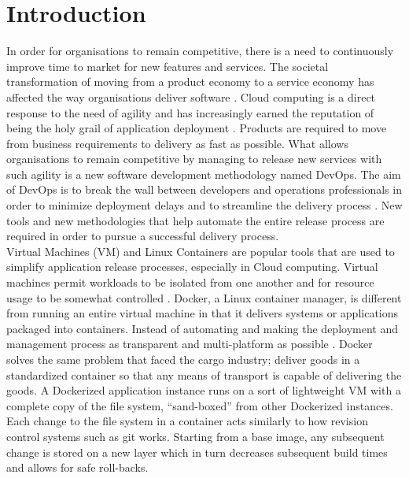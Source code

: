 
\chapter{Introduction}
In order for organisations to remain competitive, there is a need to continuously improve time to market for new features and services. The societal transformation of moving from a product economy to a service economy has affected the way organisations deliver software \cite{mckinsey}. Cloud computing is a direct response to the need of agility and has increasingly earned the reputation of being the holy grail of application deployment \cite{7034713}. Products are required to move from business requirements to delivery as fast as possible. What allows organisations to remain competitive by managing to release new services with such agility is a new software development methodology named DevOps. The aim of DevOps is to break the wall between developers and operations professionals in order to minimize deployment delays and to streamline the delivery process \cite{Httermann:2012:DD:2380958}. New tools and new methodologies that help automate the entire release process are required in order to pursue a successful delivery process.\\

Virtual Machines (VM) and Linux Containers are popular tools that are used to simplify application release processes, especially in Cloud computing. Virtual machines permit workloads to be isolated from one another and for resource usage to be somewhat controlled \cite{vmvscontainers}. Docker, a Linux container manager, is different from running an entire virtual machine in that it delivers systems or applications packaged into containers. Instead of automating and making the deployment and management process as transparent and multi-platform as possible \cite{vmvscontainers}. Docker solves the same problem that faced the cargo industry; deliver goods in a standardized container so that any means of transport is capable of delivering the goods. A Dockerized application instance runs on a sort of lightweight VM with a complete copy of the file system, “sand-boxed” from other Dockerized instances. Each change to the file system in a container acts similarly to how revision control systems such as git works. Starting from a base image, any subsequent change is stored on a new layer which in turn decreases subsequent build times and allows for safe roll-backs.\\

